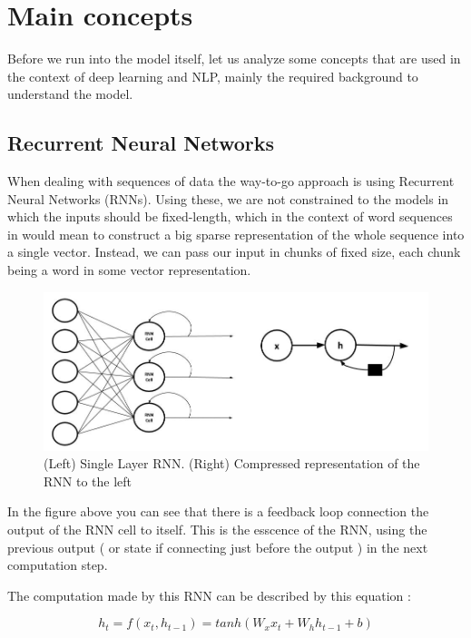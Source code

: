 \documentclass{llncs}
\begin{document}
\section{Main concepts}

Before we run into the model itself, let us analyze some concepts that are used in the context of deep learning and NLP, mainly the required background to understand the model.

\subsection{Recurrent Neural Networks}

When dealing with sequences of data the way-to-go approach is using Recurrent Neural Networks (RNNs). Using these, we are not constrained to the models in which the inputs should be fixed-length, which in the context of word sequences in would mean to construct a big sparse representation of the whole sequence into a single vector. Instead, we can pass our input in chunks of fixed size, each chunk being a word in some vector representation.


\begin{figure}[H]
    \centering
    \includegraphics[scale=0.4]{../_img/img_rnn_folded.jpg}
    \caption{(Left) Single Layer RNN. (Right) Compressed representation of the RNN to the left}
    \label{fig:img_rnn_folded}
\end{figure}

In the figure above you can see that there is a feedback loop connection the output of the RNN cell to itself. This is the esscence of the RNN, using the previous output ( or state if connecting just before the output ) in the next computation step.

The computation made by this RNN can be described by this equation :

\begin{equation}
h_{t} = f( x_{t}, h_{t-1} ) = tanh( W_{x} x_{t} + W_{h} h_{t-1} + b )
\end{equation}
\end{document}
